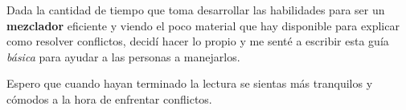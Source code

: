 Dada la cantidad de tiempo que toma desarrollar las habilidades para ser un {\bf mezclador} eficiente y viendo el poco material
que hay disponible para explicar como resolver conflictos, decidí hacer lo propio y me senté a escribir esta guía
{\it básica} para ayudar a las personas a manejarlos.

Espero que cuando hayan terminado la lectura se sientas más tranquilos y cómodos a la hora de enfrentar conflictos.


